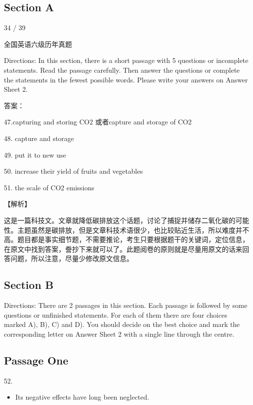 \documentclass[UTF8,11pt]{ctexart}
\begin{document}
\subsection*{\textbf{Section A}}


34 / 39


全国英语六级历年真题


Directions: In this section, there is a short passage with 5 questions or incomplete statements. Read the passage carefully. Then answer the questions or complete the statements in the fewest possible words. Please write your answers on Answer Sheet 2.


答案：


47.capturing and storing CO2 或者capture and storage of CO2


48. capture and storage


49. put it to new use


50. increase their yield of fruits and vegetables


51. the scale of CO2 emissions


【解析】


这是一篇科技文。文章就降低碳排放这个话题，讨论了捕捉并储存二氧化碳的可能性。主题虽然是碳排放，但是文章科技术语很少，也比较贴近生活，所以难度并不高。题目都是事实细节题，不需要推论，考生只要根据题干的关键词，定位信息，在原文中找到答案，誊抄下来就可以了。此题阅卷的原则就是尽量用原文的话来回答问题，所以注意，尽量少修改原文信息。


\subsection*{\textbf{Section B}}


Directions: There are 2 passages in this section. Each passage is followed by some questions or unfinished statements. For each of them there are four choices marked A), B), C) and D). You should decide on the best choice and mark the corresponding letter on Answer Sheet 2 with a single line through the centre.


\subsection*{\textbf{Passage One}}


52.


\begin{itemize}[leftmargin=2em,itemsep=.2em,topsep=.4em]\item[D.] Its negative effects have long been neglected.
\end{itemize}
\end{document}
